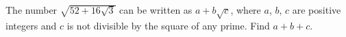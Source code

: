 The number $\sqrt{52+16\sqrt3}$ can be written as $a+b\sqrt c$, where $a$, $b$, $c$ are positive integers and $c$ is not divisible by the square of any prime. Find $a+b+c$.
